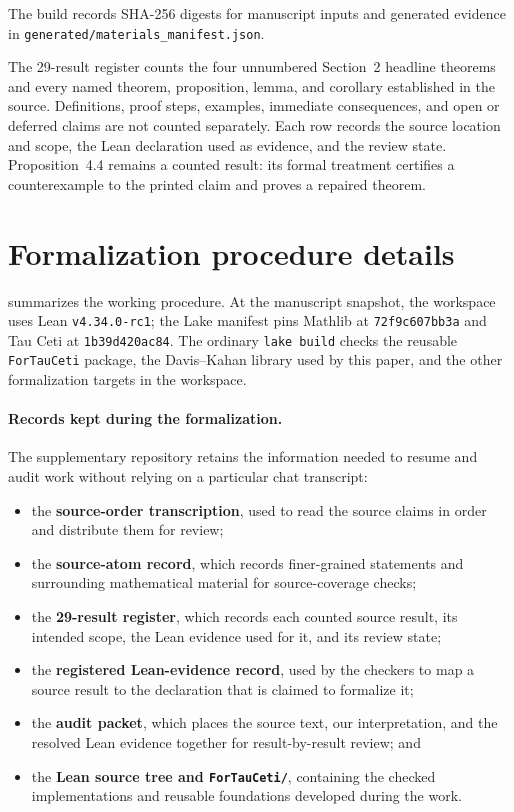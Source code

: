 The build records SHA-256 digests for manuscript inputs and generated evidence
in \texttt{generated/materials\_manifest.json}.

The 29-result register counts the four unnumbered Section~2 headline theorems
and every named theorem, proposition, lemma, and corollary established in the
source.  Definitions, proof steps, examples, immediate consequences, and open
or deferred claims are not counted separately.  Each row records the source
location and scope, the Lean declaration used as evidence, and the review state.
Proposition~4.4 remains a counted result: its formal treatment certifies a
counterexample to the printed claim and proves a repaired theorem.

\section{Formalization procedure details}
\label{app:system}

 summarizes the working procedure.  At the manuscript snapshot,
the workspace uses Lean \texttt{v4.34.0-rc1}; the Lake manifest pins Mathlib at
\texttt{72f9c607bb3a} and Tau Ceti at \texttt{1b39d420ac84}.  The ordinary
\texttt{lake build} checks the reusable \texttt{ForTauCeti} package, the
Davis--Kahan library used by this paper, and the other formalization targets in
the workspace.

\paragraph{Records kept during the formalization.}
The supplementary repository retains the information needed to resume and audit
work without relying on a particular chat transcript:
\begin{itemize}
\setlength{\itemsep}{0.2em}
\item the \textbf{source-order transcription}, used to read the source claims in
  order and distribute them for review;
\item the \textbf{source-atom record}, which records finer-grained statements and
  surrounding mathematical material for source-coverage checks;
\item the \textbf{29-result register}, which records each counted source result,
  its intended scope, the Lean evidence used for it, and its review state;
\item the \textbf{registered Lean-evidence record}, used by the checkers to map a
  source result to the declaration that is claimed to formalize it;
\item the \textbf{audit packet}, which places the source text, our interpretation,
  and the resolved Lean evidence together for result-by-result review; and
\item the \textbf{Lean source tree and \texttt{ForTauCeti/}}, containing the
  checked implementations and reusable foundations developed during the work.
\end{itemize}

